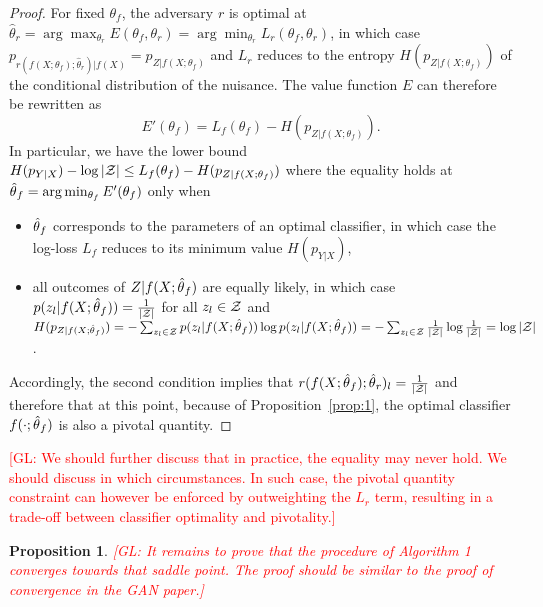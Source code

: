 \documentclass{article}
\newcommand{\glnote}[1]{\textcolor{red}{[GL: #1]}}
\theoremstyle{plain}
\newtheorem{proposition}[theorem]{Proposition}
\begin{document}
\begin{proof}

For fixed $\theta_f$, the adversary $r$ is optimal at $\hat\theta_r = \arg
\max_{\theta_r} E(\theta_f, \theta_r)  = \arg \min_{\theta_r} L_r(\theta_f,
\theta_r)$, in which case $p_{r(f(X;\theta_f);\hat\theta_r)|f(X)} = p_{Z|f(X;\theta_f)}$ and $L_r$ reduces to the entropy
$H(p_{Z|f(X;\theta_f)})$ of the conditional distribution of the nuisance. The
value function $E$ can therefore be rewritten as $$E'(\theta_f) = L_f(\theta_f) -
H(p_{Z|f(X;\theta_f)}).$$  In particular, we have the lower bound $H(p_{Y|X}) -
\log |{\cal Z}| \leq L_f(\theta_f) - H(p_{Z|f(X;\theta_f)})$ where the equality
holds at $\smash{\hat\theta}_f = \arg \min_{\theta_f} E'(\theta_f)$ only when
\begin{itemize}
    \item $\smash{\hat\theta}_f$ corresponds to
    the parameters of an optimal classifier, in which case the log-loss $L_f$
    reduces to its minimum value $H(p_{Y|X})$,
    \item all
   outcomes of $Z|f(X;\smash{\hat\theta}_f)$ are equally likely, in which case
   $p(z_l|f(X;\smash{\hat\theta}_f)) = \frac{1}{|{\cal Z}|}$ for all $z_l \in {\cal
   Z}$ and $H(p_{Z|f(X;\smash{\hat\theta}_f)}) =
   -\sum_{z_l \in {\cal Z}} p(z_l|f(X;\smash{\hat\theta}_f)) \log  p(z_l|f(X;\smash{\hat\theta}_f)) =  -\sum_{z_l \in {\cal Z}} \frac{1}{|{\cal Z}|} \log \frac{1}{|{\cal Z}|} = \log |{\cal Z}|$.
\end{itemize}
Accordingly, the second condition implies that $r(f(X;\smash{\hat\theta}_f) ;
\smash{\hat\theta}_r )_l = \frac{1}{|{\cal Z}|}$ and therefore that at this
point, because of Proposition~\ref{prop:1}, the optimal classifier $f(\cdot;\smash{\hat\theta}_f)$ is also a pivotal quantity.
\end{proof}

\glnote{We should further discuss that in practice, the equality may never hold.
We should discuss in which circumstances. In such case, the pivotal quantity
constraint can however be enforced by outweighting the $L_r$ term, resulting in a
trade-off between classifier optimality and pivotality.}

\begin{proposition}
    \glnote{It remains to prove that the procedure of Algorithm 1
    converges towards that saddle point. The proof should be similar to the proof of convergence in the GAN paper.}
\end{proposition}
\end{document}
